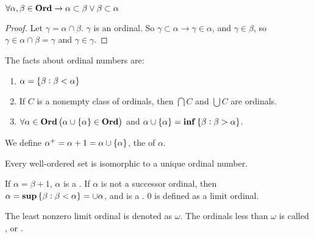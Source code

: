 \begin{theorem} 
    $\forall \alpha, \beta \in \mathbf{Ord} \rightarrow \alpha \subset \beta \vee \beta \subset \alpha$
\end{theorem}
\begin{proof}
    Let $\gamma = \alpha \cap \beta$. $\gamma$ is an ordinal. So $\gamma \subset \alpha \rightarrow \gamma \in \alpha$, and $\gamma \in \beta$, so $\gamma \in \alpha \cap \beta = \gamma$ and $\gamma \in \gamma$.
\end{proof}

\begin{theorem}
    The facts about ordinal numbers are:
    \begin{enumerate}
        \item $\alpha = \set{\beta: \beta < \alpha}$
        \item If $C$ is a nonempty class of ordinals, then $\bigcap C$ and $\bigcup C$ are ordinals.
        \item $\forall \alpha \in \mathbf{Ord} \left(\alpha \cup \set{\alpha} \in \mathbf{Ord} \right)$ and $\alpha \cup \set{\alpha} = \mathbf{inf} \set{\beta: \beta > \alpha}$.
    \end{enumerate}    
\end{theorem}

\begin{definition}
    We define $\alpha^{+} =  \alpha + 1 = \alpha \cup \set{\alpha}$, the  of $\alpha$.
\end{definition}


\begin{theorem}
    Every well-ordered set is isomorphic to a unique ordinal number.    
\end{theorem}

\begin{definition}
    If $\alpha = \beta + 1$, $\alpha$ is a . If $\alpha$ is not a successor ordinal, then $\alpha = \mathbf{sup} \set{\beta: \beta < \alpha} = \cup \alpha$, and is a . $0$ is defined as a limit ordinal.
\end{definition}


\begin{definition}
    The least nonzero limit ordinal is denoted as $\omega$. The ordinals less than $\omega$ is called , or .
\end{definition}

